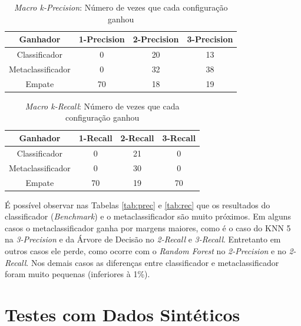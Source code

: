 \begin{table}[h!]
  \begin{center}
    \begin{tabular}{cccc}
      \hline
      \textbf{Ganhador} & \textbf{1-Precision} & \textbf{2-Precision} & \textbf{3-Precision}\\
      \hline

Classificador	&	0	&	20	&	13	\\
Metaclassificador	&	0	&	32	&	38	\\
Empate	&	70	&	18	&	19	\\

      \hline
    \end{tabular}
    \caption{\textit{Macro k-Precision}: Número de vezes que cada configuração ganhou}
    \label{tab:count_prec}
  \end{center}
\end{table}

\begin{table}[h!]
  \begin{center}
    \begin{tabular}{cccc}
      \hline
      \textbf{Ganhador} & \textbf{1-Recall} & \textbf{2-Recall} & \textbf{3-Recall}\\
      \hline

Classificador	&	0	&	21	&	0	\\
Metaclassificador	&	0	&	30	&	0	\\
Empate	&	70	&	19	&	70	\\

      \hline
    \end{tabular}
    \caption{\textit{Macro k-Recall}: Número de vezes que cada configuração ganhou}
    \label{tab:count_rec}
  \end{center}
\end{table}

É possível observar nas Tabelas \ref{tab:prec} e \ref{tab:rec} que os resultados do classificador (\textit{Benchmark}) e o metaclassificador são muito próximos.
Em alguns casos o metaclassificador ganha por margens maiores, como é o caso do KNN 5 na \textit{3-Precision} e da Árvore de Decisão no \textit{2-Recall} e \textit{3-Recall}.
Entretanto em outros casos ele perde, como ocorre com o \textit{Random Forest} no \textit{2-Precision} e no \textit{2-Recall}.
Nos demais casos as diferenças entre classificador e metaclassificador foram muito pequenas (inferiores à 1\%).

\section{Testes com Dados Sintéticos}

